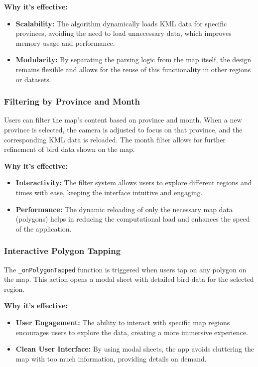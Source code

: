 \documentclass{article}
\begin{document}
\textbf{Why it's effective:}
\begin{itemize}
    \item \textbf{Scalability:} The algorithm dynamically loads KML data for specific provinces, avoiding the need to load unnecessary data, which improves memory usage and performance.
    \item \textbf{Modularity:} By separating the parsing logic from the map itself, the design remains flexible and allows for the reuse of this functionality in other regions or datasets.
\end{itemize}

\subsubsection{Filtering by Province and Month}
Users can filter the map’s content based on province and month. When a new province is selected, the camera is adjusted to focus on that province, and the corresponding KML data is reloaded. The month filter allows for further refinement of bird data shown on the map.

\textbf{Why it's effective:}
\begin{itemize}
    \item \textbf{Interactivity:} The filter system allows users to explore different regions and times with ease, keeping the interface intuitive and engaging.
    \item \textbf{Performance:} The dynamic reloading of only the necessary map data (polygons) helps in reducing the computational load and enhances the speed of the application.
\end{itemize}

\subsubsection{Interactive Polygon Tapping}
The \texttt{\_onPolygonTapped} function is triggered when users tap on any polygon on the map. This action opens a modal sheet with detailed bird data for the selected region.

\textbf{Why it's effective:}
\begin{itemize}
    \item \textbf{User Engagement:} The ability to interact with specific map regions encourages users to explore the data, creating a more immersive experience.
    \item \textbf{Clean User Interface:} By using modal sheets, the app avoids cluttering the map with too much information, providing details on demand.
\end{itemize}
\end{document}
